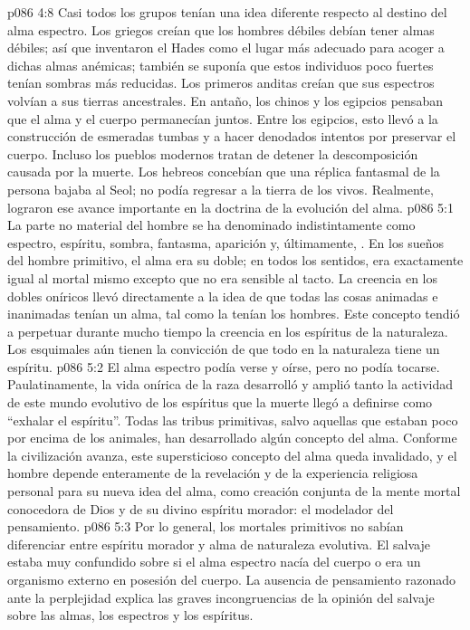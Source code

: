 \vs p086 4:8 Casi todos los grupos tenían una idea diferente respecto al destino del alma espectro. Los griegos creían que los hombres débiles debían tener almas débiles; así que inventaron el Hades como el lugar más adecuado para acoger a dichas almas anémicas; también se suponía que estos individuos poco fuertes tenían sombras más reducidas. Los primeros anditas creían que sus espectros volvían a sus tierras ancestrales. En antaño, los chinos y los egipcios pensaban que el alma y el cuerpo permanecían juntos. Entre los egipcios, esto llevó a la construcción de esmeradas tumbas y a hacer denodados intentos por preservar el cuerpo. Incluso los pueblos modernos tratan de detener la descomposición causada por la muerte. Los hebreos concebían que una réplica fantasmal de la persona bajaba al Seol; no podía regresar a la tierra de los vivos. Realmente, lograron ese avance importante en la doctrina de la evolución del alma.
\vs p086 5:1 La parte no material del hombre se ha denominado indistintamente como espectro, espíritu, sombra, fantasma, aparición y, últimamente, . En los sueños del hombre primitivo, el alma era su doble; en todos los sentidos, era exactamente igual al mortal mismo excepto que no era sensible al tacto. La creencia en los dobles oníricos llevó directamente a la idea de que todas las cosas animadas e inanimadas tenían un alma, tal como la tenían los hombres. Este concepto tendió a perpetuar durante mucho tiempo la creencia en los espíritus de la naturaleza. Los esquimales aún tienen la convicción de que todo en la naturaleza tiene un espíritu.
\vs p086 5:2 El alma espectro podía verse y oírse, pero no podía tocarse. Paulatinamente, la vida onírica de la raza desarrolló y amplió tanto la actividad de este mundo evolutivo de los espíritus que la muerte llegó a definirse como “exhalar el espíritu”. Todas las tribus primitivas, salvo aquellas que estaban poco por encima de los animales, han desarrollado algún concepto del alma. Conforme la civilización avanza, este supersticioso concepto del alma queda invalidado, y el hombre depende enteramente de la revelación y de la experiencia religiosa personal para su nueva idea del alma, como creación conjunta de la mente mortal conocedora de Dios y de su divino espíritu morador: el modelador del pensamiento.
\vs p086 5:3 Por lo general, los mortales primitivos no sabían diferenciar entre espíritu morador y alma de naturaleza evolutiva. El salvaje estaba muy confundido sobre si el alma espectro nacía del cuerpo o era un organismo externo en posesión del cuerpo. La ausencia de pensamiento razonado ante la perplejidad explica las graves incongruencias de la opinión del salvaje sobre las almas, los espectros y los espíritus.
